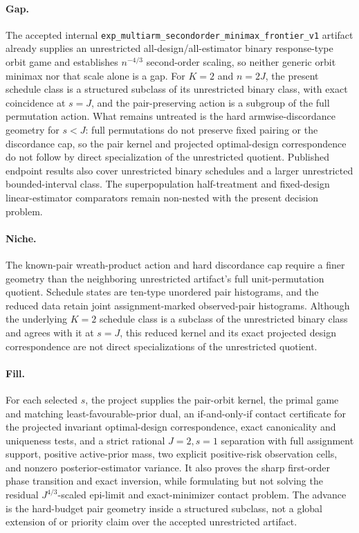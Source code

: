 \documentclass{article}
\begin{document}
\paragraph{Gap.} The accepted internal \texttt{exp\_multiarm\_secondorder\_minimax\_frontier\_v1} artifact already supplies an unrestricted all-design/all-estimator binary response-type orbit game and establishes \(n^{-4/3}\) second-order scaling, so neither generic orbit minimax nor that scale alone is a gap. For \(K=2\) and \(n=2J\), the present schedule class is a structured subclass of its unrestricted binary class, with exact coincidence at \(s=J\), and the pair-preserving action is a subgroup of the full permutation action. What remains untreated is the hard armwise-discordance geometry for \(s<J\): full permutations do not preserve fixed pairing or the discordance cap, so the pair kernel and projected optimal-design correspondence do not follow by direct specialization of the unrestricted quotient. Published endpoint results also cover unrestricted binary schedules and a larger unrestricted bounded-interval class. The superpopulation half-treatment and fixed-design linear-estimator comparators remain non-nested with the present decision problem.

\paragraph{Niche.} The known-pair wreath-product action and hard discordance cap require a finer geometry than the neighboring unrestricted artifact's full unit-permutation quotient. Schedule states are ten-type unordered pair histograms, and the reduced data retain joint assignment-marked observed-pair histograms. Although the underlying \(K=2\) schedule class is a subclass of the unrestricted binary class and agrees with it at \(s=J\), this reduced kernel and its exact projected design correspondence are not direct specializations of the unrestricted quotient.

\paragraph{Fill.} For each selected \(s\), the project supplies the pair-orbit kernel, the primal game and matching least-favourable-prior dual, an if-and-only-if contact certificate for the projected invariant optimal-design correspondence, exact canonicality and uniqueness tests, and a strict rational \(J=2,s=1\) separation with full assignment support, positive active-prior mass, two explicit positive-risk observation cells, and nonzero posterior-estimator variance. It also proves the sharp first-order phase transition and exact inversion, while formulating but not solving the residual \(J^{4/3}\)-scaled epi-limit and exact-minimizer contact problem. The advance is the hard-budget pair geometry inside a structured subclass, not a global extension of or priority claim over the accepted unrestricted artifact.
\end{document}
